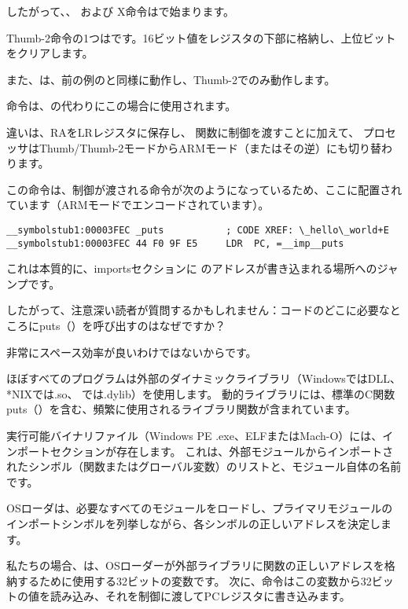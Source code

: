 
したがって、、  および X命令はで始まります。

Thumb-2命令の1つはです。16ビット値をレジスタの下部に格納し、上位ビットをクリアします。

また、は、前の例のと同様に動作し、Thumb-2でのみ動作します。


命令は、の代わりにこの場合に使用されます。

違いは、\ac{RA}を\ac{LR}レジスタに保存し、 \puts 関数に制御を渡すことに加えて、
プロセッサはThumb/Thumb-2モードからARMモード（またはその逆）にも切り替わります。

この命令は、制御が渡される命令が次のようになっているため、ここに配置されています（ARMモードでエンコードされています）。

\begin{lstlisting}[style=customasmARM]
__symbolstub1:00003FEC _puts           ; CODE XREF: \_hello\_world+E
__symbolstub1:00003FEC 44 F0 9F E5     LDR  PC, =__imp__puts
\end{lstlisting}

これは本質的に、importsセクションに \puts のアドレスが書き込まれる場所へのジャンプです。

したがって、注意深い読者が質問するかもしれません：コードのどこに必要なところにputs（）を呼び出すのはなぜですか？

非常にスペース効率が良いわけではないからです。

ほぼすべてのプログラムは外部のダイナミックライブラリ（WindowsではDLL、*NIXでは.so、 \MacOSX では.dylib）を使用します。
動的ライブラリには、標準のC関数puts（）を含む、頻繁に使用されるライブラリ関数が含まれています。

実行可能バイナリファイル（Windows PE .exe、ELFまたはMach-O）には、インポートセクションが存在します。
これは、外部モジュールからインポートされたシンボル（関数またはグローバル変数）のリストと、モジュール自体の名前です。

\ac{OS}ローダは、必要なすべてのモジュールをロードし、プライマリモジュールのインポートシンボルを列挙しながら、各シンボルの正しいアドレスを決定します。

私たちの場合、は、\ac{OS}ローダーが外部ライブラリに関数の正しいアドレスを格納するために使用する32ビットの変数です。
次に、命令はこの変数から32ビットの値を読み込み、それを制御に渡して\ac{PC}レジスタに書き込みます。

